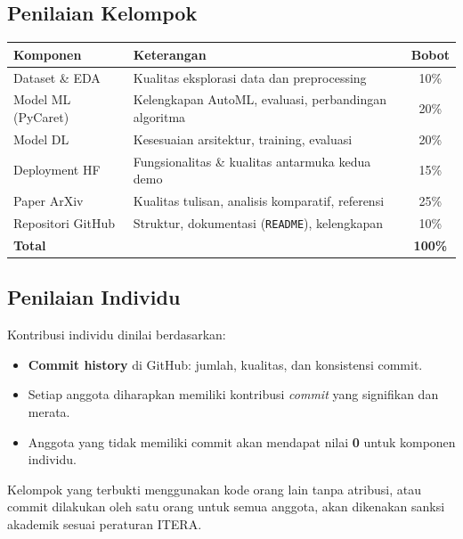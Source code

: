 \documentclass[11pt,a4paper]{article}
\begin{document}
\subsection{Penilaian Kelompok}

\begin{center}
\begin{tabular}{lp{8cm}c}
\toprule
\textbf{Komponen} & \textbf{Keterangan} & \textbf{Bobot} \\
\midrule
Dataset \& EDA       & Kualitas eksplorasi data dan preprocessing & 10\% \\
Model ML (PyCaret)   & Kelengkapan AutoML, evaluasi, perbandingan algoritma & 20\% \\
Model DL             & Kesesuaian arsitektur, training, evaluasi & 20\% \\
Deployment HF        & Fungsionalitas \& kualitas antarmuka kedua demo & 15\% \\
Paper ArXiv          & Kualitas tulisan, analisis komparatif, referensi & 25\% \\
Repositori GitHub    & Struktur, dokumentasi (\texttt{README}), kelengkapan & 10\% \\
\midrule
\textbf{Total}       & & \textbf{100\%} \\
\bottomrule
\end{tabular}
\end{center}

\subsection{Penilaian Individu}

Kontribusi individu dinilai berdasarkan:
\begin{itemize}
  \item \textbf{Commit history} di GitHub: jumlah, kualitas, dan konsistensi commit.
  \item Setiap anggota diharapkan memiliki kontribusi \textit{commit} yang signifikan dan merata.
  \item Anggota yang tidak memiliki commit akan mendapat nilai \textbf{0} untuk komponen individu.
\end{itemize}

\begin{tcolorbox}[colback=red!5,colframe=accent,title=\textbf{Perhatian}]
  Kelompok yang terbukti menggunakan kode orang lain tanpa atribusi, atau commit dilakukan oleh satu orang untuk semua anggota, akan dikenakan sanksi akademik sesuai peraturan ITERA.
\end{tcolorbox}
\end{document}
